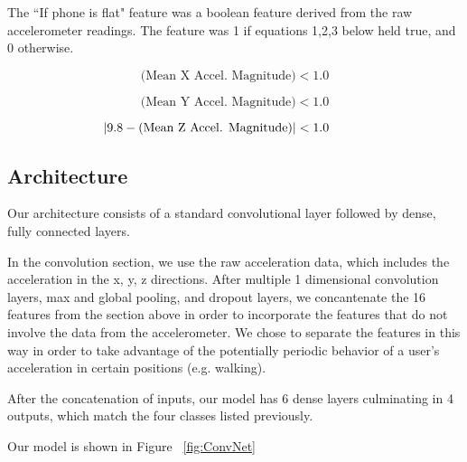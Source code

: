The ``If phone is flat" feature was a boolean feature derived from the raw accelerometer readings. 
The feature was 1 if equations 1,2,3 below held true, and 0 otherwise.

\begin{equation}\label{eq1}
 \text{(Mean X Accel. Magnitude)} < 1.0 
\end{equation}

\begin{equation}\label{eq2}
\text{(Mean Y Accel. Magnitude)} < 1.0
\end{equation}

\begin{equation}\label{eq1}
\hspace*{-1cm}|9.8 - \text{(Mean Z Accel. Magnitude)}| < 1.0
\end{equation}



\subsection{Architecture}
Our architecture consists of a standard convolutional layer followed by dense, fully connected layers.


\begin{figure*}[!h]
  \vspace{-0.2cm}
  \centering
   {}
  \caption{The architecture of our convolutional neural net}
  \label{fig:ConvNet}
  \vspace{-0.1cm}
\end{figure*}

In the convolution section, we use the raw acceleration data, which includes the acceleration in the x, y, z directions. 
After multiple 1 dimensional convolution layers, max and global pooling, and dropout layers, 
we concantenate the 16 features from the section above in order to incorporate the features that do not involve the data from the accelerometer. 
We chose to separate the features in this way in order to take advantage of the potentially periodic behavior of a user's acceleration in certain positions (e.g. walking).

After the concatenation of inputs, our model has 6 dense layers culminating in  4 outputs, which match the four classes listed previously. 

Our model is shown in Figure ~\ref{fig:ConvNet}
